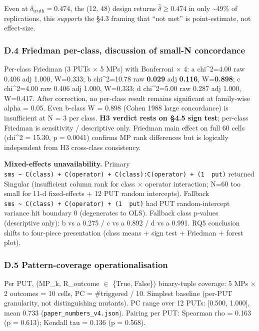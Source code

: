 \documentclass[review,12pt,authoryear]{elsarticle}
\begin{document}
Even at $\delta_{\mathrm{truth}} = 0.474$, the (12, 48) design returns $\hat{\delta} \geq
0.474$ in only \textasciitilde49\% of replications, this
\emph{supports} the §4.3 framing that ``not met'' is point-estimate, not
effect-size.

\subsubsection{D.4 Friedman per-class, discussion of small-N concordance}\label{d.4-friedman-per-class-discussion-of-small-n-concordance}

Per-class Friedman (3 PUTs $\times$ 5 MPs) with Bonferroni $\times$ 4: a chi\^{}2=4.00
raw 0.406 adj 1.000, W=0.333; b chi\^{}2=10.78 raw \textbf{0.029} adj
\textbf{0.116}, W=\textbf{0.898}; c chi\^{}2=4.00 raw 0.406 adj 1.000,
W=0.333; d chi\^{}2=5.00 raw 0.287 adj 1.000, W=0.417. After correction,
no per-class result remains significant at family-wise alpha = 0.05.
Even b-class W = 0.898 (Cohen 1988 large concordance) is insufficient at
N = 3 per class. \textbf{H3 verdict rests on §4.5 sign test}; per-class
Friedman is sensitivity / descriptive only. Friedman main effect on full
60 cells (chi\^{}2 = 15.30, p = 0.0041) confirms MP rank differences but
is logically independent from H3 cross-class consistency.

\textbf{Mixed-effects unavailability.} Primary
\texttt{sms\ \textasciitilde{}\ C(class)\ +\ C(operator)\ +\ C(class):C(operator)\ +\ (1\ \textbar{}\ put)}
returned Singular (insufficient column rank for class $\times$ operator
interaction; N=60 too small for 11-d fixed-effects + 12 PUT random
intercepts). Fallback
\texttt{sms\ \textasciitilde{}\ C(class)\ +\ C(operator)\ +\ (1\ \textbar{}\ put)}
had PUT random-intercept variance hit boundary 0 (degenerates to OLS).
Fallback class p-values (descriptive only): b vs a 0.275 / c vs a 0.892
/ d vs a 0.991. RQ5 conclusion shifts to four-piece presentation (class
means + sign test + Friedman + forest plot).

\subsubsection{D.5 Pattern-coverage operationalisation}\label{d.5-pattern-coverage-operationalisation}

Per PUT, (MP\_k, R\_outcome $\in$ \{True, False\}) binary-tuple coverage: 5
MPs $\times$ 2 outcomes = 10 cells, PC = \#triggered / 10. Simplest baseline
(per-PUT granularity, not distinguishing mutants). PC range over 12
PUTs: {[}0.500, 1.000{]}, mean 0.733 (\texttt{paper\_numbers\_v4.json}).
Pairing per PUT: Spearman rho = 0.163 (p = 0.613); Kendall tau = 0.136
(p = 0.568).
\end{document}
